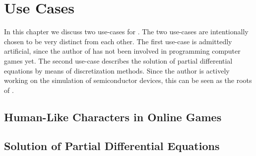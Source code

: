\chapter{Use Cases} \label{chap:use-cases}
In this chapter we discuss two use-cases for {\ViennaData}. The two use-cases are
intentionally chosen to be very distinct from each other. The first use-case is
admittedly artificial, since the author of {\ViennaData} has not been involved in
programming computer games yet. The second use-case describes the solution of partial differential equations by means of discretization methods.
Since the author is actively working on the simulation of semiconductor devices, this can be seen as the roots of {\ViennaData}.

\section{Human-Like Characters in Online Games}


\section{Solution of Partial Differential Equations}

